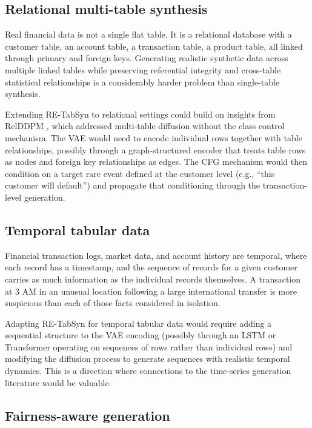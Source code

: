\subsection{Relational multi-table synthesis}

Real financial data is not a single flat table. It is a relational database with a customer table, an account table, a transaction table, a product table, all linked through primary and foreign keys. Generating realistic synthetic data across multiple linked tables while preserving referential integrity and cross-table statistical relationships is a considerably harder problem than single-table synthesis.

Extending RE-TabSyn to relational settings could build on insights from RelDDPM \cite{liu2024relddpm}, which addressed multi-table diffusion without the class control mechanism. The VAE would need to encode individual rows together with table relationships, possibly through a graph-structured encoder that treats table rows as nodes and foreign key relationships as edges. The CFG mechanism would then condition on a target rare event defined at the customer level (e.g., ``this customer will default'') and propagate that conditioning through the transaction-level generation.

\subsection{Temporal tabular data}

Financial transaction logs, market data, and account history are temporal, where each record has a timestamp, and the sequence of records for a given customer carries as much information as the individual records themselves. A transaction at 3 AM in an unusual location following a large international transfer is more suspicious than each of those facts considered in isolation.

Adapting RE-TabSyn for temporal tabular data would require adding a sequential structure to the VAE encoding (possibly through an LSTM or Transformer operating on sequences of rows rather than individual rows) and modifying the diffusion process to generate sequences with realistic temporal dynamics. This is a direction where connections to the time-series generation literature \cite{takahashi2019gansfinance, sattarov2024leveraging} would be valuable.

\subsection{Fairness-aware generation}

